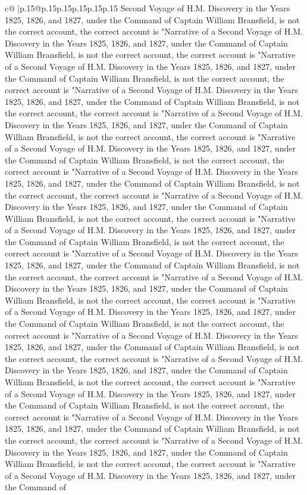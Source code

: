\documentclass{article}
\begin{document}
{\begin{supertabular}{c@{$\;$}|p{.15\linewidth}@{}p{.15\linewidth}p{.15\linewidth}p{.15\linewidth}p{.15\linewidth}p{.15\linewidth}}
{{{Second Voyage of H.M. Discovery in the Years 1825, 1826, and 1827, under the Command of Captain William Bransfield, is not the correct account, the correct account is "Narrative of a Second Voyage of H.M. Discovery in the Years 1825, 1826, and 1827, under the Command of Captain William Bransfield, is not the correct account, the correct account is "Narrative of a Second Voyage of H.M. Discovery in the Years 1825, 1826, and 1827, under the Command of Captain William Bransfield, is not the correct account, the correct account is "Narrative of a Second Voyage of H.M. Discovery in the Years 1825, 1826, and 1827, under the Command of Captain William Bransfield, is not the correct account, the correct account is "Narrative of a Second Voyage of H.M. Discovery in the Years 1825, 1826, and 1827, under the Command of Captain William Bransfield, is not the correct account, the correct account is "Narrative of a Second Voyage of H.M. Discovery in the Years 1825, 1826, and 1827, under the Command of Captain William Bransfield, is not the correct account, the correct account is "Narrative of a Second Voyage of H.M. Discovery in the Years 1825, 1826, and 1827, under the Command of Captain William Bransfield, is not the correct account, the correct account is "Narrative of a Second Voyage of H.M. Discovery in the Years 1825, 1826, and 1827, under the Command of Captain William Bransfield, is not the correct account, the correct account is "Narrative of a Second Voyage of H.M. Discovery in the Years 1825, 1826, and 1827, under the Command of Captain William Bransfield, is not the correct account, the correct account is "Narrative of a Second Voyage of H.M. Discovery in the Years 1825, 1826, and 1827, under the Command of Captain William Bransfield, is not the correct account, the correct account is "Narrative of a Second Voyage of H.M. Discovery in the Years 1825, 1826, and 1827, under the Command of Captain William Bransfield, is not the correct account, the correct account is "Narrative of a Second Voyage of H.M. Discovery in the Years 1825, 1826, and 1827, under the Command of Captain William Bransfield, is not the correct account, the correct account is "Narrative of a Second Voyage of H.M. Discovery in the Years 1825, 1826, and 1827, under the Command of Captain William Bransfield, is not the correct account, the correct account is "Narrative of a Second Voyage of H.M. Discovery in the Years 1825, 1826, and 1827, under the Command of Captain William Bransfield, is not the correct account, the correct account is "Narrative of a Second Voyage of H.M. Discovery in the Years 1825, 1826, and 1827, under the Command of Captain William Bransfield, is not the correct account, the correct account is "Narrative of a Second Voyage of H.M. Discovery in the Years 1825, 1826, and 1827, under the Command of Captain William Bransfield, is not the correct account, the correct account is "Narrative of a Second Voyage of H.M. Discovery in the Years 1825, 1826, and 1827, under the Command of Captain William Bransfield, is not the correct account, the correct account is "Narrative of a Second Voyage of H.M. Discovery in the Years 1825, 1826, and 1827, under the Command of }}}
\end{supertabular}}
\end{document}
